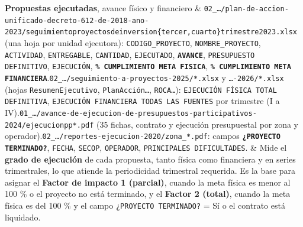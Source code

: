 \documentclass[11pt,a4paper]{article}
\begin{document}
{\begin{longtable}
\textbf{Propuestas ejecutadas}, avance físico y financiero & \texttt{02\_\allowbreak{}\ldots{}/\allowbreak{}plan-\allowbreak{}de-\allowbreak{}accion-\allowbreak{}unificado-\allowbreak{}decreto-\allowbreak{}612-\allowbreak{}de-\allowbreak{}2018-\allowbreak{}ano-\allowbreak{}2023/\allowbreak{}seguimientoproyectosdeinversion\{tercer,cuarto\}trimestre2023.\allowbreak{}xlsx} (una hoja por unidad ejecutora): \texttt{CODIGO\_\allowbreak{}PROYECTO}, \texttt{NOMBRE\_\allowbreak{}PROYECTO}, \texttt{ACTIVIDAD}, \texttt{ENTREGABLE}, \texttt{CANTIDAD}, \texttt{EJECUTADO}, \textbf{\texttt{AVANCE}}, \texttt{PRESUPUESTO DEFINITIVO}, \texttt{EJECUCIÓN}, \textbf{\texttt{\% CUMPLIMIENTO META FISICA}}, \textbf{\texttt{\% CUMPLIMIENTO META FINANCIERA}}.\newline \texttt{02\_\allowbreak{}\ldots{}/\allowbreak{}seguimiento-\allowbreak{}a-\allowbreak{}proyectos-\allowbreak{}2025/\allowbreak{}*.\allowbreak{}xlsx} y \texttt{\ldots{}-\allowbreak{}2026/\allowbreak{}*.\allowbreak{}xlsx} (hojas \texttt{ResumenEjecutivo}, \texttt{PlanAcción\ldots{}}, \texttt{ROCA\ldots{}}): \texttt{EJECUCIÓN FÍSICA TOTAL DEFINITIVA}, \texttt{EJECUCIÓN FINANCIERA TODAS LAS FUENTES} por trimestre (I a IV).\newline \texttt{01\_\allowbreak{}\ldots{}/\allowbreak{}avance-\allowbreak{}de-\allowbreak{}ejecucion-\allowbreak{}de-\allowbreak{}presupuestos-\allowbreak{}participativos-\allowbreak{}2024/\allowbreak{}ejecucionpp*.\allowbreak{}pdf} (35 fichas, contrato y ejecución presupuestal por zona y operador).\newline \texttt{02\_\allowbreak{}\ldots{}/\allowbreak{}reportes-\allowbreak{}ejecucion-\allowbreak{}2020/\allowbreak{}zona\_\allowbreak{}*.\allowbreak{}pdf}: campos \textbf{\texttt{¿PROYECTO TERMINADO?}}, \texttt{FECHA}, \texttt{SECOP}, \texttt{OPERADOR}, \texttt{PRINCIPALES DIFICULTADES}. & Mide el \textbf{grado de ejecución} de cada propuesta, tanto física como financiera y en series trimestrales, lo que atiende la periodicidad trimestral requerida. Es la base para asignar el \textbf{Factor de impacto 1 (parcial)}, cuando la meta física es menor al 100 \% o el proyecto no está terminado, y el \textbf{Factor 2 (total)}, cuando la meta física es del 100 \% y el campo \texttt{¿PROYECTO TERMINADO?} = Sí o el contrato está liquidado. \\

\end{longtable}}
\end{document}

